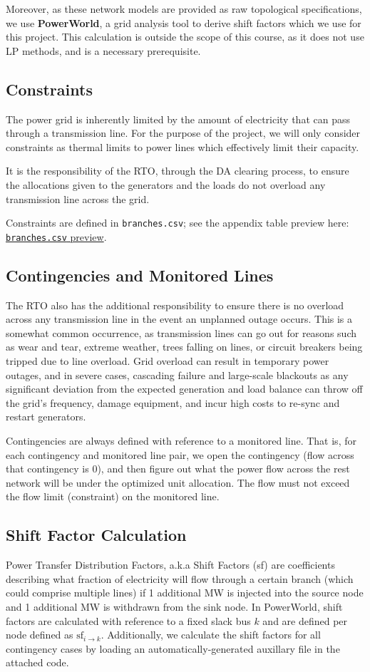\documentclass[11pt]{article}
\begin{document}
Moreover, as these network models are provided as raw topological specifications, we use \textbf{PowerWorld}, a grid analysis tool to derive shift factors which we use for this project. This calculation is outside the scope of this course, as it does not use LP methods, and is a necessary prerequisite.

\subsection{Constraints}
The power grid is inherently limited by the amount of electricity that can pass through a transmission line. For the purpose of the project, we will only consider constraints as thermal limits to power lines which effectively limit their capacity.

It is the responsibility of the RTO, through the DA clearing process, to ensure the allocations given to the generators and the loads do not overload any transmission line across the grid.

Constraints are defined in \texttt{branches.csv}; see the appendix table preview here: \hyperref[app:branches-preview]{\texttt{branches.csv} preview}.

\newpage
\subsection{Contingencies and Monitored Lines}
The RTO also has the additional responsibility to ensure there is no overload across any transmission line in the event an unplanned outage occurs. This is a somewhat common occurrence, as transmission lines can go out for reasons such as wear and tear, extreme weather, trees falling on lines, or circuit breakers being tripped due to line overload. Grid overload can result in temporary power outages, and in severe cases, cascading failure and large-scale blackouts as any significant deviation from the expected generation and load balance can throw off the grid's frequency, damage equipment, and incur high costs to re-sync and restart generators.

Contingencies are always defined with reference to a monitored line. That is, for each contingency and monitored line pair, we open the contingency (flow across that contingency is 0), and then figure out what the power flow across the rest network will be under the optimized unit allocation. The flow must not exceed the flow limit (constraint) on the monitored line.


\subsection{Shift Factor Calculation}
Power Transfer Distribution Factors, a.k.a Shift Factors (sf) are coefficients describing what fraction of electricity will flow through a certain branch (which could comprise multiple lines) if 1 additional MW is injected into the source node and 1 additional MW is withdrawn from the sink node. In PowerWorld, shift factors are calculated with reference to a fixed slack bus $k$ and are defined per node defined as $\text{sf}_{i \rightarrow k}$. Additionally, we calculate the shift factors for all contingency cases by loading an automatically-generated auxillary file in the attached code.
\end{document}
